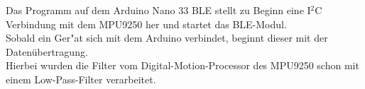 Das Programm auf dem Arduino Nano 33 BLE stellt zu Beginn eine 
I$^2$C Verbindung mit dem MPU9250 her und startet das BLE-Modul.\\
Sobald ein Ger"at sich mit dem Arduino verbindet, beginnt dieser
mit der Datenübertragung.\\
Hierbei wurden die Filter vom Digital-Motion-Processor des MPU9250 
schon mit einem Low-Pass-Filter verarbeitet. 